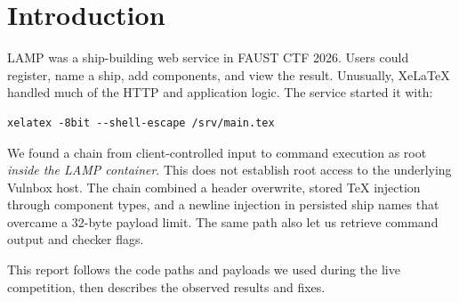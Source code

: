 \section{Introduction}
\label{sec:introduction}

LAMP was a ship-building web service in FAUST CTF 2026. Users could register,
name a ship, add components, and view the result. Unusually, XeLaTeX handled
much of the HTTP and application logic. The service started it with:

\begin{lstlisting}
xelatex -8bit --shell-escape /srv/main.tex
\end{lstlisting}

We found a chain from client-controlled input to command execution as root
\emph{inside the LAMP container}. This does not establish root access to the
underlying Vulnbox host. The chain combined a  header overwrite,
stored TeX injection through component types, and a newline injection in
persisted ship names that overcame a 32-byte payload limit. The same path
also let us retrieve command output and checker flags.

This report follows the code paths and payloads we used during the live
competition, then describes the observed results and fixes.

